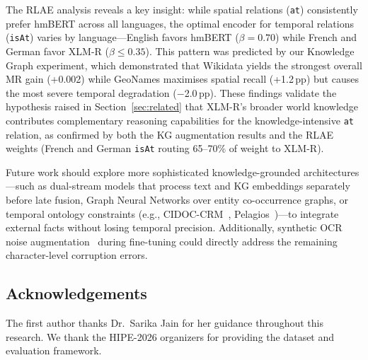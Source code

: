 \documentclass[11pt,a4paper]{article}
\begin{document}
The RLAE analysis reveals a key insight: while spatial relations (\texttt{at}) consistently prefer hmBERT across all languages, the optimal encoder for temporal relations (\texttt{isAt}) varies by language---English favors hmBERT ($\beta=0.70$) while French and German favor XLM-R ($\beta \leq 0.35$). This pattern was predicted by our Knowledge Graph experiment, which demonstrated that Wikidata yields the strongest overall MR gain (+0.002) while GeoNames maximises spatial recall (+1.2\,pp) but causes the most severe temporal degradation ($-$2.0\,pp). These findings validate the hypothesis raised in Section~\ref{sec:related} that XLM-R's broader world knowledge contributes complementary reasoning capabilities for the knowledge-intensive \texttt{at} relation, as confirmed by both the KG augmentation results and the RLAE weights (French and German \texttt{isAt} routing 65--70\% of weight to XLM-R).

Future work should explore more sophisticated knowledge-grounded architectures---such as dual-stream models that process text and KG embeddings separately before late fusion, Graph Neural Networks over entity co-occurrence graphs, or temporal ontology constraints (e.g., CIDOC-CRM~\cite{doerr2003}, Pelagios~\cite{simon2017})---to integrate external facts without losing temporal precision. Additionally, synthetic OCR noise augmentation~\cite{boros2020} during fine-tuning could directly address the remaining character-level corruption errors.

\subsection*{Acknowledgements}

The first author thanks Dr.~Sarika Jain for her guidance throughout this research. We thank the HIPE-2026 organizers for providing the dataset and evaluation framework.

\end{document}
